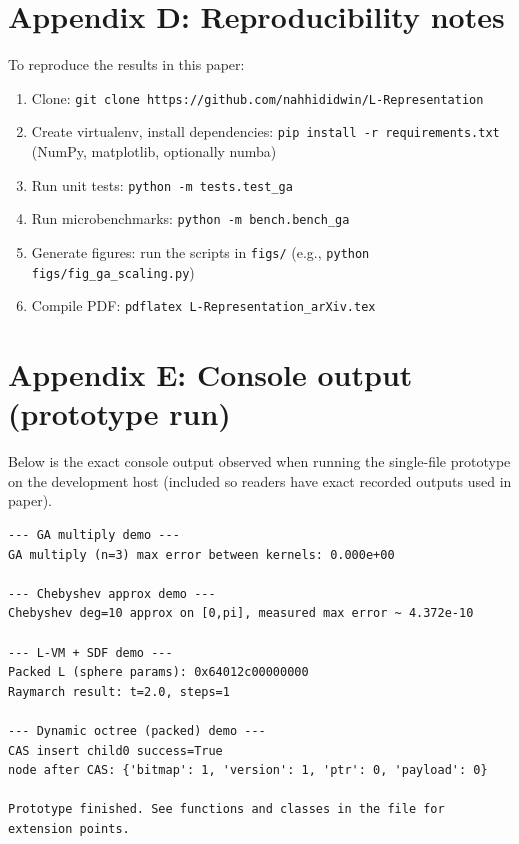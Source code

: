 \documentclass[11pt]{article}
\theoremstyle{definition}
\theoremstyle{plain}
\begin{document}
\section{Appendix D: Reproducibility notes}\label{app:reprod}
To reproduce the results in this paper:
\begin{enumerate}
  \item Clone: \texttt{git clone https://github.com/nahhididwin/L-Representation}
  \item Create virtualenv, install dependencies: \texttt{pip install -r requirements.txt} (NumPy, matplotlib, optionally numba)
  \item Run unit tests: \texttt{python -m tests.test\_ga}
  \item Run microbenchmarks: \texttt{python -m bench.bench\_ga}
  \item Generate figures: run the scripts in \texttt{figs/} (e.g., \texttt{python figs/fig\_ga\_scaling.py})
  \item Compile PDF: \texttt{pdflatex L-Representation\_arXiv.tex}
\end{enumerate}

\section{Appendix E: Console output (prototype run)}
Below is the exact console output observed when running the single-file prototype on the development host (included so readers have exact recorded outputs used in paper).

\begin{verbatim}
--- GA multiply demo ---
GA multiply (n=3) max error between kernels: 0.000e+00

--- Chebyshev approx demo ---
Chebyshev deg=10 approx on [0,pi], measured max error ~ 4.372e-10

--- L-VM + SDF demo ---
Packed L (sphere params): 0x64012c00000000
Raymarch result: t=2.0, steps=1

--- Dynamic octree (packed) demo ---
CAS insert child0 success=True
node after CAS: {'bitmap': 1, 'version': 1, 'ptr': 0, 'payload': 0}

Prototype finished. See functions and classes in the file for extension points.
\end{verbatim}
\end{document}
